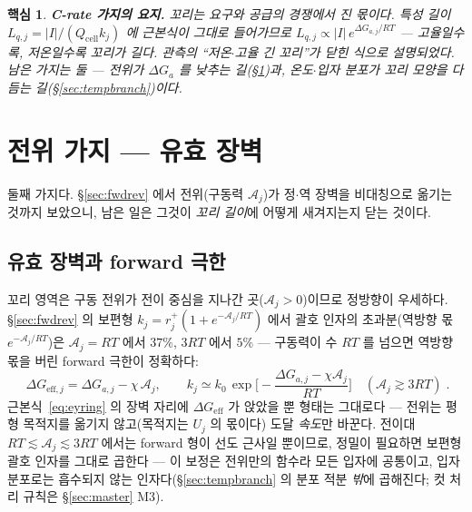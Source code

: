 \documentclass[11pt,a4paper]{article}
\newtheorem*{keybox}{핵심}
\newcommand{\eff}{\mathrm{eff}}
\newcommand{\cell}{\mathrm{cell}}
\begin{document}
\begin{keybox}
\textbf{C-rate 가지의 요지.} 꼬리는 요구와 공급의 경쟁에서 진 몫이다. 특성 길이
$L_{q,j}=|I|/(Q_\cell k_j)$ 에 근본식이 그대로 들어가므로 $L_{q,j}\propto|I|\,e^{\Delta G_{a,j}/RT}$ —
고율일수록, 저온일수록 꼬리가 길다. 관측의 ``저온$\cdot$고율 긴 꼬리''가 닫힌 식으로 설명되었다. 남은
가지는 둘 — 전위가 $\Delta G_a$ 를 낮추는 길(\S\ref{sec:potbranch})과, 온도$\cdot$입자 분포가 꼬리
모양을 다듬는 길(\S\ref{sec:tempbranch})이다.
\end{keybox}

\section{전위 가지 — 유효 장벽}\label{sec:potbranch}
둘째 가지다. \S\ref{sec:fwdrev} 에서 전위(구동력 $\mathcal A_j$)가 정$\cdot$역 장벽을 비대칭으로
옮기는 것까지 보았으니, 남은 일은 그것이 \emph{꼬리 길이}에 어떻게 새겨지는지 닫는 것이다.

\subsection{유효 장벽과 forward 극한}
꼬리 영역은 구동 전위가 전이 중심을 지나간 곳($\mathcal A_j>0$)이므로 정방향이 우세하다.
\S\ref{sec:fwdrev} 의 보편형 $k_j=r_j^+(1+e^{-\mathcal A_j/RT})$ 에서 괄호 인자의 초과분(역방향
몫 $e^{-\mathcal A_j/RT}$)은 $\mathcal A_j=RT$ 에서 $37\%$, $3RT$ 에서 $5\%$ — 구동력이 수 $RT$ 를
넘으면 역방향 몫을 버린 forward 극한이 정확하다:
\begin{equation}
\boxed{\;\Delta G_{\eff,j}=\Delta G_{a,j}-\chi\,\mathcal A_j,\qquad
k_j\simeq k_0\,\exp\!\Big[-\frac{\Delta G_{a,j}-\chi\mathcal A_j}{RT}\Big]
\quad(\mathcal A_j\gtrsim3RT)\;.}
\label{eq:keff}
\end{equation}
근본식~\eqref{eq:eyring} 의 장벽 자리에 $\Delta G_{\eff}$ 가 앉았을 뿐 형태는 그대로다 — 전위는 평형
목적지를 옮기지 않고(목적지는 $U_j$ 의 몫이다) 도달 \emph{속도}만 바꾼다. 전이대
$RT\lesssim\mathcal A_j\lesssim3RT$ 에서는 forward 형이 선도 근사일 뿐이므로, 정밀이 필요하면 보편형
괄호 인자를 그대로 곱한다 — 이 보정은 전위만의 함수라 모든 입자에 공통이고, 입자 분포로는 흡수되지 않는
인자다(\S\ref{sec:tempbranch} 의 분포 적분 \emph{밖}에 곱해진다; 컷 처리 규칙은 \S\ref{sec:master}
M3).
\end{document}
